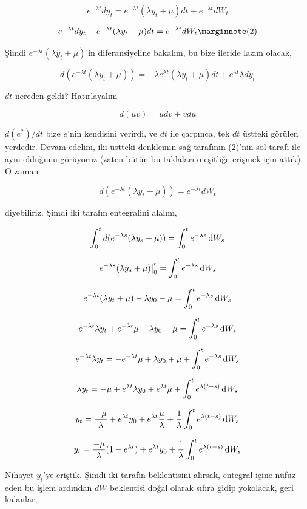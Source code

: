 \documentclass[12pt,fleqn]{article}\usepackage{../../common}
\begin{document}
$$ e^{-\lambda t}dy_t = e^{-\lambda t}(\lambda y_t + \mu)dt + e^{-\lambda t} dW_t  $$

$$ e^{-\lambda t}dy_t - e^{-\lambda t}(\lambda y_t + \mu)dt =  e^{-\lambda t} dW_t 
\mlabel{2}
$$

Şimdi $e^{-\lambda t}(\lambda y_t + \mu)$'in diferansiyeline bakalım, bu
bize ileride lazım olacak,

$$ d(e^{-\lambda t}(\lambda y_t + \mu)) = 
-\lambda e^{\lambda t} (\lambda y_t + \mu) dt + e^{\lambda t} \lambda dy_t 
$$

$dt$ nereden geldi? Hatırlayalım 

$$ d(uv) = u dv + v du $$

$d(e^{?})/dt$ bize $e$'nin kendisini verirdi, ve $dt$ ile çarpınca, tek $dt$
üstteki görülen yerdedir. Devam edelim, iki üstteki denklemin sağ tarafının
(2)'nin sol tarafı ile aynı olduğunu görüyoruz (zaten bütün bu taklaları o
eşitliğe erişmek için attık). O zaman

$$ d(e^{-\lambda t}(\lambda y_t + \mu)) =  e^{-\lambda t} dW_t  $$

diyebiliriz. Şimdi iki tarafın entegralini alalım,

$$
\int _{0}^{t} d(e^{-\lambda s}(\lambda y_s + \mu)) =
\int_{0}^{t} e^{-\lambda s} \,\mathrm{d} W_s
$$

$$
e^{-\lambda s}(\lambda y_s + \mu) \big|_{0}^{t} =
\int_{0}^{t} e^{-\lambda s} \,\mathrm{d} W_s
$$

$$
e^{-\lambda t}(\lambda y_t + \mu) - \lambda y_0 - \mu =
\int_{0}^{t} e^{-\lambda s} \,\mathrm{d} W_s
$$

$$
e^{-\lambda t}\lambda y_t + e^{-\lambda t}\mu - \lambda y_0 - \mu =
\int_{0}^{t} e^{-\lambda s} \,\mathrm{d} W_s
$$

$$ 
e^{-\lambda t}\lambda y_t  =
- e^{-\lambda t}\mu + \lambda y_0 + \mu + \int_{0}^{t} e^{-\lambda s} \,\mathrm{d} W_s 
$$

$$ 
\lambda y_t   =
- \mu + e^{\lambda t} \lambda y_0 + e^{\lambda t}\mu + \int_{0}^{t} e^{\lambda (t-s)} \,\mathrm{d} W_s 
$$

$$ 
y_t   = \frac{-\mu}{\lambda} + e^{\lambda t} y_0 + e^{\lambda t}\frac{\mu}{\lambda} + 
\frac{1}{\lambda}\int_{0}^{t} e^{\lambda (t-s)} \,\mathrm{d} W_s 
$$

$$ 
y_t = \frac{-\mu}{\lambda} ( 1 - e^{\lambda t}) + e^{\lambda t} y_0 + 
\frac{1}{\lambda}\int_{0}^{t} e^{\lambda (t-s)} \,\mathrm{d} W_s 
$$

Nihayet $y_t$'ye eriştik. Şimdi iki tarafın beklentisini alırsak, entegral
içine nüfuz eden bu işlem ardından $dW$ beklentisi doğal olarak sıfıra
gidip yokolacak, geri kalanlar,
\end{document}
